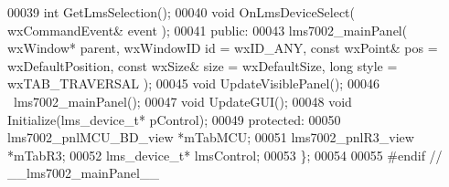 \begin{DoxyCode}
00039         \textcolor{keywordtype}{int} GetLmsSelection();
00040         \textcolor{keywordtype}{void} OnLmsDeviceSelect( wxCommandEvent& event );
00041     \textcolor{keyword}{public}:
00043         lms7002_mainPanel( wxWindow* parent, wxWindowID \textcolor{keywordtype}{id} = wxID\_ANY, \textcolor{keyword}{const} wxPoint& pos = 
      wxDefaultPosition, \textcolor{keyword}{const} wxSize& size = wxDefaultSize, \textcolor{keywordtype}{long} style = wxTAB\_TRAVERSAL );
00045         \textcolor{keywordtype}{void} UpdateVisiblePanel();
00046         ~lms7002_mainPanel();
00047         \textcolor{keywordtype}{void} UpdateGUI();
00048         \textcolor{keywordtype}{void} Initialize(lms_device_t* pControl);
00049 \textcolor{keyword}{protected}:
00050         lms7002_pnlMCU_BD_view *mTabMCU;
00051         lms7002_pnlR3_view *mTabR3;
00052         lms_device_t* lmsControl;
00053 \};
00054 
00055 \textcolor{preprocessor}{#endif // \_\_lms7002\_mainPanel\_\_}
\end{DoxyCode}
